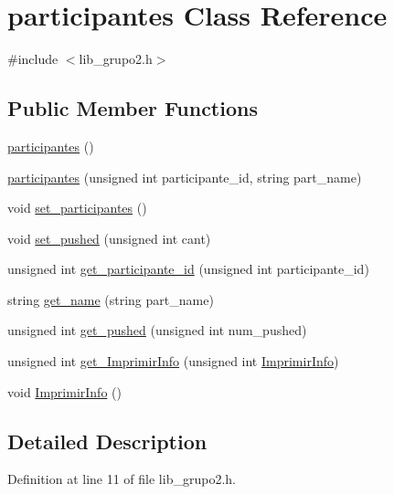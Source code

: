 \hypertarget{classparticipantes}{}\section{participantes Class Reference}
\label{classparticipantes}


{\ttfamily \#include $<$lib\+\_\+grupo2.\+h$>$}

\subsection*{Public Member Functions}
\begin{DoxyCompactItemize}
\item 
\hyperlink{classparticipantes_ac95bc17bd08e136d953af333d36a3930}{participantes} ()
\item 
\hyperlink{classparticipantes_ab5fb3ef09a7754876e365fef81a786d8}{participantes} (unsigned int participante\+\_\+id, string part\+\_\+name)
\item 
void \hyperlink{classparticipantes_a1b220cb322e21b17548d2a61b8df5125}{set\+\_\+participantes} ()
\item 
void \hyperlink{classparticipantes_aab4459455c32ff7c8ce75734fb3f335a}{set\+\_\+pushed} (unsigned int cant)
\item 
unsigned int \hyperlink{classparticipantes_a643de8965fc3b97be17befdc983be5b4}{get\+\_\+participante\+\_\+id} (unsigned int participante\+\_\+id)
\item 
string \hyperlink{classparticipantes_adb2548c80ef57db146570148a810d875}{get\+\_\+name} (string part\+\_\+name)
\item 
unsigned int \hyperlink{classparticipantes_ae38b0ef6e201f1310a810467aba88649}{get\+\_\+pushed} (unsigned int num\+\_\+pushed)
\item 
unsigned int \hyperlink{classparticipantes_a641f0127662b2b17e193d3b24b18a35e}{get\+\_\+\+Imprimir\+Info} (unsigned int \hyperlink{classparticipantes_a2177447cffbb9d2b2074dcc0e7d09f3f}{Imprimir\+Info})
\item 
void \hyperlink{classparticipantes_a2177447cffbb9d2b2074dcc0e7d09f3f}{Imprimir\+Info} ()
\end{DoxyCompactItemize}


\subsection{Detailed Description}


Definition at line 11 of file lib\+\_\+grupo2.\+h.



